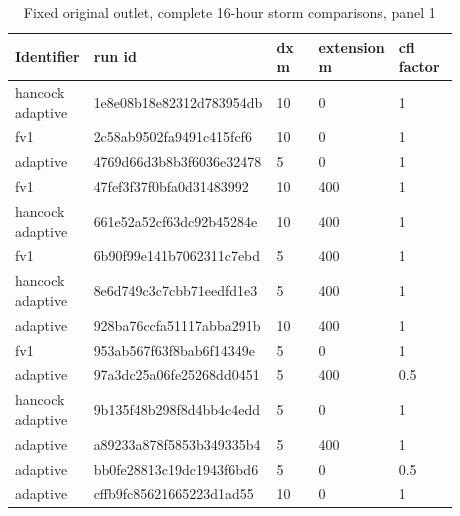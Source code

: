 \begingroup
\small
\setlength{\tabcolsep}{2pt}
\begin{longtable}{p{0.1760\linewidth}p{0.1760\linewidth}p{0.1760\linewidth}p{0.1760\linewidth}p{0.1760\linewidth}}
\caption{Fixed original outlet, complete 16-hour storm comparisons, panel 1}\\
\hline
Identifier & run id & dx m & extension m & cfl factor \\
\hline\endhead
hancock adaptive & 1e8e08b18e82312d783954db & 10 & 0 & 1 \\
fv1 & 2c58ab9502fa9491c415fcf6 & 10 & 0 & 1 \\
adaptive & 4769d66d3b8b3f6036e32478 & 5 & 0 & 1 \\
fv1 & 47fef3f37f0bfa0d31483992 & 10 & 400 & 1 \\
hancock adaptive & 661e52a52cf63dc92b45284e & 10 & 400 & 1 \\
fv1 & 6b90f99e141b7062311c7ebd & 5 & 400 & 1 \\
hancock adaptive & 8e6d749c3c7cbb71eedfd1e3 & 5 & 400 & 1 \\
adaptive & 928ba76ccfa51117abba291b & 10 & 400 & 1 \\
fv1 & 953ab567f63f8bab6f14349e & 5 & 0 & 1 \\
adaptive & 97a3dc25a06fe25268dd0451 & 5 & 400 & 0.5 \\
hancock adaptive & 9b135f48b298f8d4bb4c4edd & 5 & 0 & 1 \\
adaptive & a89233a878f5853b349335b4 & 5 & 400 & 1 \\
adaptive & bb0fe28813c19dc1943f6bd6 & 5 & 0 & 0.5 \\
adaptive & cffb9fc85621665223d1ad55 & 10 & 0 & 1 \\
\end{longtable}

